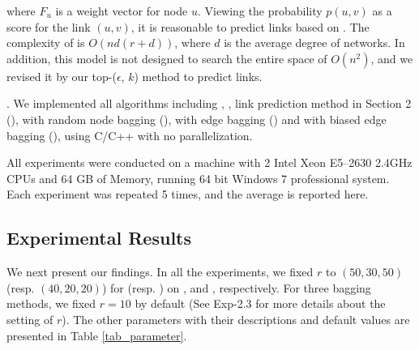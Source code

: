 \noindent  where $F_u$ is a weight vector for node $u$. Viewing the probability $p(u, v)$ as
  a score for the link $(u, v)$, it is reasonable to predict links based on \BIGCLAM.
The complexity of  \BIGCLAM is $O(nd(r + d) )$, where $d$ is the average degree of networks.
  In addition, this model is not designed to search the entire space of $O( n^2 )$,
  and we revised it by our top-($\epsilon$, $k$) method to predict links.


.
We implemented all algorithms including \Aa, \BIGCLAM, link prediction method in Section 2 (\NMF),
\NMF with random node bagging (\Node), \NMF with  edge bagging (\Edge) and
\NMF with biased edge bagging (\Biased),  using C/C++ with no parallelization.


All experiments were conducted on a machine with 2 Intel Xeon
E5--2630 2.4GHz CPUs and 64 GB of Memory, running 64 bit
Windows 7 professional system. Each experiment was repeated 5 times,
and the average is reported here.



\subsection{Experimental Results}


We next present our findings. In all the experiments, we fixed $r$ to
$(50, 30, 50)$ (resp. $(40, 20, 20)$) for \NMF (resp. \BIGCLAM) on
\YouTube, \Flickr and \Wikipedia, respectively. For three bagging
methods, we fixed $r = 10$ by default (See Exp-2.3 for more details
about the setting of $r$). The other parameters with their
descriptions and default values are presented in Table \ref{tab_parameter}.





